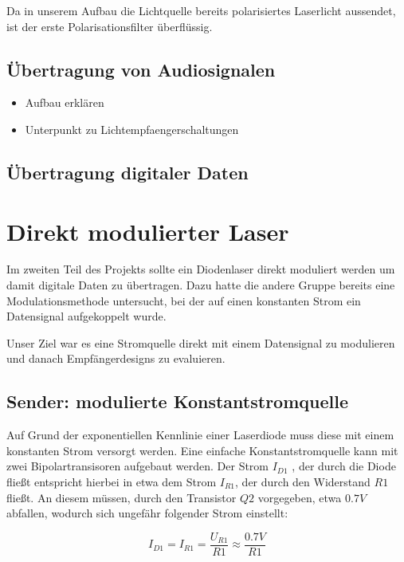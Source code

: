 \documentclass[12pt,a4paper]{article}
\begin{document}
Da in unserem Aufbau die Lichtquelle bereits polarisiertes Laserlicht aussendet, ist der erste Polarisationsfilter überflüssig.


\subsection{Übertragung von Audiosignalen}
\begin{itemize}
\item Aufbau erklären
\item Unterpunkt zu Lichtempfaengerschaltungen
\end{itemize}

\subsection{Übertragung digitaler Daten}





\section{Direkt modulierter Laser}
Im zweiten Teil des Projekts sollte ein Diodenlaser direkt moduliert werden um damit digitale Daten zu übertragen. Dazu hatte die andere Gruppe bereits eine Modulationsmethode untersucht, bei der auf einen konstanten Strom ein Datensignal aufgekoppelt wurde.

Unser Ziel war es eine Stromquelle direkt mit einem Datensignal zu modulieren und danach Empfängerdesigns zu evaluieren.


\subsection{Sender: modulierte Konstantstromquelle}
\label{sec:direct_tx}
Auf Grund der exponentiellen Kennlinie einer Laserdiode muss diese mit einem konstanten Strom versorgt werden. Eine einfache Konstantstromquelle kann mit zwei Bipolartransisoren aufgebaut werden. Der Strom $I_{D1}$ , der durch die Diode fließt entspricht hierbei in etwa dem Strom $I_{R1}$, der durch den Widerstand $R1$ fließt. An diesem müssen, durch den Transistor  $Q2$ vorgegeben, etwa $0.7V$ abfallen, wodurch sich ungefähr folgender Strom einstellt:

\begin{equation}
I_{D1} = I_{R1} = \frac{U_{R1}}{R1} \approx \frac{0.7V}{R1}
\end{equation}
\end{document}

